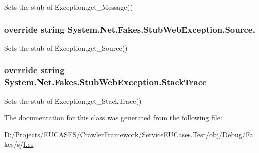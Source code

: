 Sets the stub of Exception.\-get\-\_\-\-Message()

\hypertarget{class_system_1_1_net_1_1_fakes_1_1_stub_web_exception_a2deea1720cbe46991a88b68511ff7484}{
\subsubsection[{Source}]{\setlength{\rightskip}{0pt plus 5cm}override string System.\-Net.\-Fakes.\-Stub\-Web\-Exception.\-Source\hspace{0.3cm}{\ttfamily [get]}, {\ttfamily [set]}}}\label{class_system_1_1_net_1_1_fakes_1_1_stub_web_exception_a2deea1720cbe46991a88b68511ff7484}


Sets the stub of Exception.\-get\-\_\-\-Source()

\hypertarget{class_system_1_1_net_1_1_fakes_1_1_stub_web_exception_ae8a72e3fd0e2b950e0195d8503c1da0c}{
\subsubsection[{Stack\-Trace}]{\setlength{\rightskip}{0pt plus 5cm}override string System.\-Net.\-Fakes.\-Stub\-Web\-Exception.\-Stack\-Trace\hspace{0.3cm}{\ttfamily [get]}}}\label{class_system_1_1_net_1_1_fakes_1_1_stub_web_exception_ae8a72e3fd0e2b950e0195d8503c1da0c}


Sets the stub of Exception.\-get\-\_\-\-Stack\-Trace()



The documentation for this class was generated from the following file\-:\begin{DoxyCompactItemize}
\item 
D\-:/\-Projects/\-E\-U\-C\-A\-S\-E\-S/\-Crawler\-Framework/\-Service\-E\-U\-Cases.\-Test/obj/\-Debug/\-Fakes/s/\hyperlink{s_2f_8cs}{f.\-cs}\end{DoxyCompactItemize}
